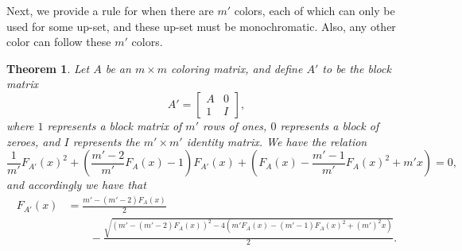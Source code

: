 \documentclass[12pt]{amsart}
\newtheorem{theorem}{Theorem}
\newcommand{\gfll}[1]{F_{#1}(x)}
\newcommand{\gfall}{\gfll{A}}
\begin{document}
Next, we provide a rule for when there are $m'$ colors, each of which can only be used for some up-set, 
and these up-set must be monochromatic. Also, any other color can follow these $m'$ colors.
\begin{theorem}\label{prop:separateupsetsonly}
    Let $A$ be an $m\times m$ coloring matrix, and define $A'$ to be the block matrix
    \[
    A'=\left[\begin{array}{c|c}A&0\\\hline1&I\end{array}\right],
    \]
    where $1$ represents a block matrix of $m'$ rows of ones, $0$ represents a block of zeroes, and $I$ represents the $m'\times m'$ identity matrix.
    We have the relation
    \[
    \frac{1}{m'}\gfll{A'}^2+\left(\frac{m'-2}{m'}\gfall-1\right)\gfll{A'}+\left(\gfall-\frac{m'-1}{m'}\gfall^2+m'x\right)=0,
    \]
    and accordingly we have that
    \begin{align*}
    \gfll{A'} &=\frac{m'-(m'-2)\gfall}{2} \\
    &\qquad - \frac{\sqrt{(m'-(m'-2)\gfall)^2-4(m'\gfall-(m'-1)\gfall^2+(m')^2x)}}{2}.
    \end{align*}
\end{theorem}
\end{document}
